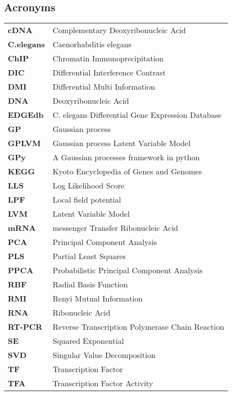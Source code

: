 \clearpage
\subsection{Acronyms}
\begin{table}[!htbp]
\renewcommand{\arraystretch}{1.3}
\begin{tabular}{l | l }
      \textbf{cDNA} & {Complementary Deoxyribonucleic Acid}\\
      \textbf{C.elegans} & {Caenorhabditis elegans} \\
      \textbf{ChIP} & {Chromatin Immunoprecipitation} \\
      \textbf{DIC} & {Differential Interference Contrast}\\ 
      \textbf{DMI} & {Differential Multi Information}\\
      \textbf{DNA} & {Deoxyribonucleic Acid} \\
      \textbf{EDGEdb} & {C. elegans Differential Gene Expression Database} \\
      \textbf{GP} & {Gaussian process} \\
      \textbf{GPLVM} & {Gaussian process Latent Variable Model} \\
      \textbf{GPy} & {A Gaussian processes framework in python} \\
      \textbf{KEGG} & {Kyoto Encyclopedia of Genes and Genomes} \\
      \textbf{LLS} & {Log Likelihood Score} \\
      \textbf{LPF} & {Local field potential} \\
      \textbf{LVM} & {Latent Variable Model} \\
      \textbf{mRNA} & {messenger Transfer Ribonucleic Acid} \\
      \textbf{PCA} & {Principal Component Analysis}\\
      \textbf{PLS} & {Partial Least Squares} \\
      \textbf{PPCA} & {Probabilistic Principal Component Analysis}\\
      \textbf{RBF} & {Radial Basis Function} \\
      \textbf{RMI} & {Renyi Mutual Information}\\
      \textbf{RNA} & {Ribonucleic Acid}\\
      \textbf{RT-PCR} & {Reverse Transcription Polymerase Chain Reaction} \\ %
      \textbf{SE} & {Squared Exponential} \\
      \textbf{SVD} & {Singular Value Decomposition} \\
      \textbf{TF} & {Transcription Factor} \\
      \textbf{TFA} & {Transcription Factor Activity} \\
  \end{tabular}
\end{table}
